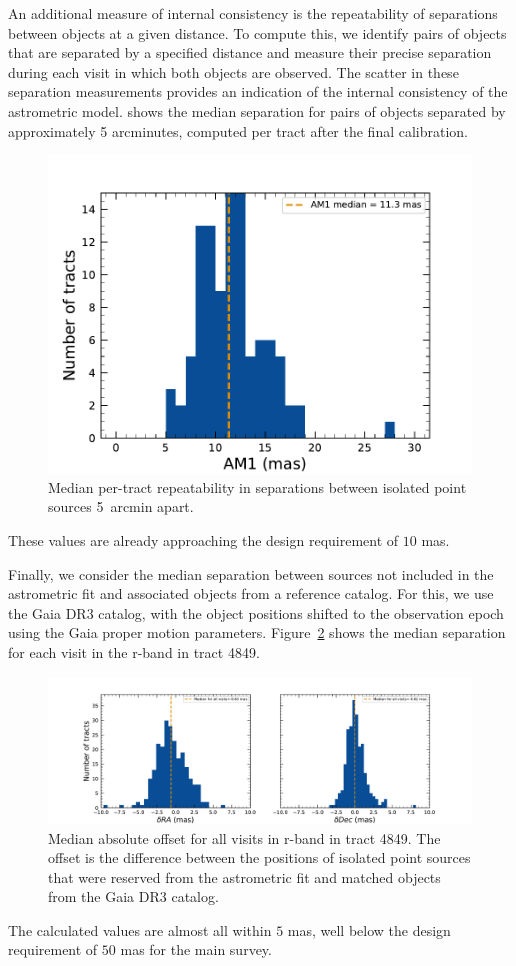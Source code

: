 An additional measure of internal consistency is the repeatability of separations between objects at a given distance.
To compute this, we identify pairs of objects that are separated by a specified distance and measure their precise separation during each visit in which both objects are observed.
The scatter in these separation measurements provides an indication of the internal consistency of the astrometric model.
 shows the median separation for pairs of objects separated by approximately 5 arcminutes, computed per tract after the final calibration.
 \begin{figure}[htb!]
 \centering
 \includegraphics[width=0.9\linewidth]{Astrometry_AM1.pdf}
 \caption{Median per-tract repeatability in separations between isolated point sources 5~arcmin apart.}
 \label{fig:AM1}
 \end{figure}
These values are already approaching the design requirement of $10$ mas.

Finally, we consider the median separation between sources not included in the astrometric fit and associated objects from a reference catalog.
For this, we use the Gaia \gls{DR3} catalog, with the object positions shifted to the observation epoch using the Gaia proper motion parameters.
Figure~\ref{fig:AA1} shows the median separation for each visit in the r-band in \gls{tract} 4849.
\begin{figure}[htb!]
\centering
\includegraphics[width=0.9\linewidth]{Astrometry_AA1}
\caption{Median absolute offset for all visits in r-band in \gls{tract} 4849. 
The offset is the difference between the positions of isolated point sources that were reserved from the astrometric fit and matched objects from the Gaia DR3 catalog.}
\label{fig:AA1}
\vspace{0.1cm}
\end{figure}
The calculated values are almost all within $5$\xspace mas, well below the design requirement of $50$\xspace mas for the main survey.

